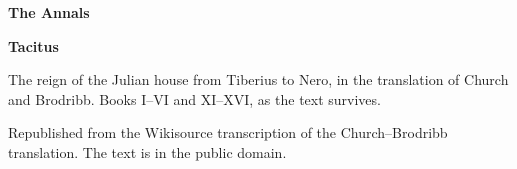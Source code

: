 \documentclass[11pt,letterpaper]{article}
\begin{document}
\color{ink}

\begin{titlepage}
\centering
\vspace*{4em}
{\LARGE\bfseries\color{heading} The Annals\par}
\vspace{2em}
{\Large\bfseries\color{heading} Tacitus\par}
\vspace{2.5em}
{\itshape\color{subhead}\parbox{0.8\linewidth}{\centering The reign of the Julian house from Tiberius to Nero, in the translation of Church and Brodribb. Books I--VI and XI--XVI, as the text survives.\par}}
\vfill
{\small Republished from the Wikisource transcription of the Church--Brodribb translation. The text is in the public domain.\par}
\vspace{2em}
\end{titlepage}

\tableofcontents


\end{document}
